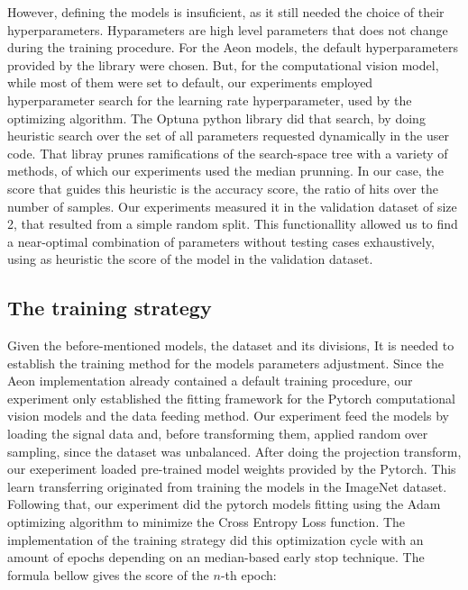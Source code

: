 



However, defining the models is insuficient, as it still needed the choice of their hyperparameters. Hyparameters are high level parameters that does not change during the training procedure. For the Aeon models, the default hyperparameters provided by the library were chosen. But, for the computational vision model, while most of them were set to default, our experiments employed hyperparameter search for the learning rate hyperparameter, used by the optimizing algorithm. The Optuna python library \cite{OptunaDoc} did that search, by doing heuristic search over the set of all parameters requested dynamically in the user code. That libray prunes ramifications of the search-space tree with a variety of methods, of which our experiments used the median prunning. In our case, the score that guides this heuristic is the accuracy score, the ratio of hits over the number of samples. Our experiments measured it in the validation dataset of size 2, that resulted from a simple random split. This functionallity allowed us to find a near-optimal combination of parameters without testing cases exhaustively, using as heuristic the score of the model in the validation dataset.

\subsection{The training strategy}

Given the before-mentioned models, the dataset and its divisions, It is needed to establish the training method for the models parameters adjustment. Since the Aeon implementation already contained a default training procedure, our experiment only established the fitting framework for the Pytorch computational vision models and the data feeding method. Our experiment feed the models by loading the signal data and, before transforming them, applied random over sampling, since the dataset was unbalanced. After doing the projection transform, our exeperiment loaded pre-trained model weights provided by the Pytorch. This learn transferring originated from training the models in the ImageNet \cite{ImageNet} dataset. Following that, our experiment did the pytorch models fitting using the Adam optimizing algorithm \cite{Adam} to minimize the Cross Entropy Loss function. The implementation of the training strategy did this optimization cycle with an amount of epochs depending on an median-based early stop technique. The formula bellow gives the score of the $n$-th epoch:

